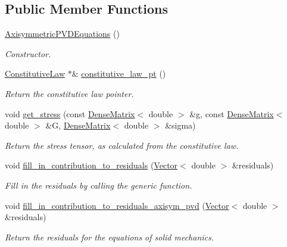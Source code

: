 \subsection*{Public Member Functions}
\begin{DoxyCompactItemize}
\item 
\hyperlink{classoomph_1_1AxisymmetricPVDEquations_acb73b32e5b0b2a80b164a445c2c8ac9a}{Axisymmetric\+P\+V\+D\+Equations} ()
\begin{DoxyCompactList}\small\item\em Constructor. \end{DoxyCompactList}\item 
\hyperlink{classoomph_1_1ConstitutiveLaw}{Constitutive\+Law} $\ast$\& \hyperlink{classoomph_1_1AxisymmetricPVDEquations_a29cc14b3e1516630a1a6e52ce63ead46}{constitutive\+\_\+law\+\_\+pt} ()
\begin{DoxyCompactList}\small\item\em Return the constitutive law pointer. \end{DoxyCompactList}\item 
void \hyperlink{classoomph_1_1AxisymmetricPVDEquations_ad7984168072632f9d4f7218d81ca50eb}{get\+\_\+stress} (const \hyperlink{classoomph_1_1DenseMatrix}{Dense\+Matrix}$<$ double $>$ \&g, const \hyperlink{classoomph_1_1DenseMatrix}{Dense\+Matrix}$<$ double $>$ \&G, \hyperlink{classoomph_1_1DenseMatrix}{Dense\+Matrix}$<$ double $>$ \&sigma)
\begin{DoxyCompactList}\small\item\em Return the stress tensor, as calculated from the constitutive law. \end{DoxyCompactList}\item 
void \hyperlink{classoomph_1_1AxisymmetricPVDEquations_a432b436b9e82c78cc06baefedc6029d4}{fill\+\_\+in\+\_\+contribution\+\_\+to\+\_\+residuals} (\hyperlink{classoomph_1_1Vector}{Vector}$<$ double $>$ \&residuals)
\begin{DoxyCompactList}\small\item\em Fill in the residuals by calling the generic function. \end{DoxyCompactList}\item 
void \hyperlink{classoomph_1_1AxisymmetricPVDEquations_a12f081b16b2f2a9e8409d4ec12a6d071}{fill\+\_\+in\+\_\+contribution\+\_\+to\+\_\+residuals\+\_\+axisym\+\_\+pvd} (\hyperlink{classoomph_1_1Vector}{Vector}$<$ double $>$ \&residuals)
\begin{DoxyCompactList}\small\item\em Return the residuals for the equations of solid mechanics. \end{DoxyCompactList}\item 

\end{DoxyCompactItemize}
